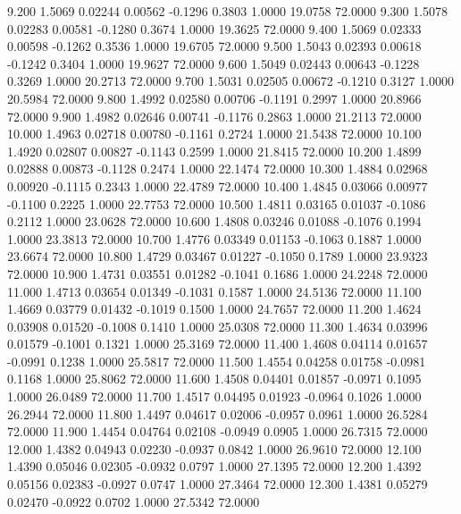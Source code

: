    9.200   1.5069   0.02244   0.00562  -0.1296   0.3803   1.0000  19.0758  72.0000
   9.300   1.5078   0.02283   0.00581  -0.1280   0.3674   1.0000  19.3625  72.0000
   9.400   1.5069   0.02333   0.00598  -0.1262   0.3536   1.0000  19.6705  72.0000
   9.500   1.5043   0.02393   0.00618  -0.1242   0.3404   1.0000  19.9627  72.0000
   9.600   1.5049   0.02443   0.00643  -0.1228   0.3269   1.0000  20.2713  72.0000
   9.700   1.5031   0.02505   0.00672  -0.1210   0.3127   1.0000  20.5984  72.0000
   9.800   1.4992   0.02580   0.00706  -0.1191   0.2997   1.0000  20.8966  72.0000
   9.900   1.4982   0.02646   0.00741  -0.1176   0.2863   1.0000  21.2113  72.0000
  10.000   1.4963   0.02718   0.00780  -0.1161   0.2724   1.0000  21.5438  72.0000
  10.100   1.4920   0.02807   0.00827  -0.1143   0.2599   1.0000  21.8415  72.0000
  10.200   1.4899   0.02888   0.00873  -0.1128   0.2474   1.0000  22.1474  72.0000
  10.300   1.4884   0.02968   0.00920  -0.1115   0.2343   1.0000  22.4789  72.0000
  10.400   1.4845   0.03066   0.00977  -0.1100   0.2225   1.0000  22.7753  72.0000
  10.500   1.4811   0.03165   0.01037  -0.1086   0.2112   1.0000  23.0628  72.0000
  10.600   1.4808   0.03246   0.01088  -0.1076   0.1994   1.0000  23.3813  72.0000
  10.700   1.4776   0.03349   0.01153  -0.1063   0.1887   1.0000  23.6674  72.0000
  10.800   1.4729   0.03467   0.01227  -0.1050   0.1789   1.0000  23.9323  72.0000
  10.900   1.4731   0.03551   0.01282  -0.1041   0.1686   1.0000  24.2248  72.0000
  11.000   1.4713   0.03654   0.01349  -0.1031   0.1587   1.0000  24.5136  72.0000
  11.100   1.4669   0.03779   0.01432  -0.1019   0.1500   1.0000  24.7657  72.0000
  11.200   1.4624   0.03908   0.01520  -0.1008   0.1410   1.0000  25.0308  72.0000
  11.300   1.4634   0.03996   0.01579  -0.1001   0.1321   1.0000  25.3169  72.0000
  11.400   1.4608   0.04114   0.01657  -0.0991   0.1238   1.0000  25.5817  72.0000
  11.500   1.4554   0.04258   0.01758  -0.0981   0.1168   1.0000  25.8062  72.0000
  11.600   1.4508   0.04401   0.01857  -0.0971   0.1095   1.0000  26.0489  72.0000
  11.700   1.4517   0.04495   0.01923  -0.0964   0.1026   1.0000  26.2944  72.0000
  11.800   1.4497   0.04617   0.02006  -0.0957   0.0961   1.0000  26.5284  72.0000
  11.900   1.4454   0.04764   0.02108  -0.0949   0.0905   1.0000  26.7315  72.0000
  12.000   1.4382   0.04943   0.02230  -0.0937   0.0842   1.0000  26.9610  72.0000
  12.100   1.4390   0.05046   0.02305  -0.0932   0.0797   1.0000  27.1395  72.0000
  12.200   1.4392   0.05156   0.02383  -0.0927   0.0747   1.0000  27.3464  72.0000
  12.300   1.4381   0.05279   0.02470  -0.0922   0.0702   1.0000  27.5342  72.0000
